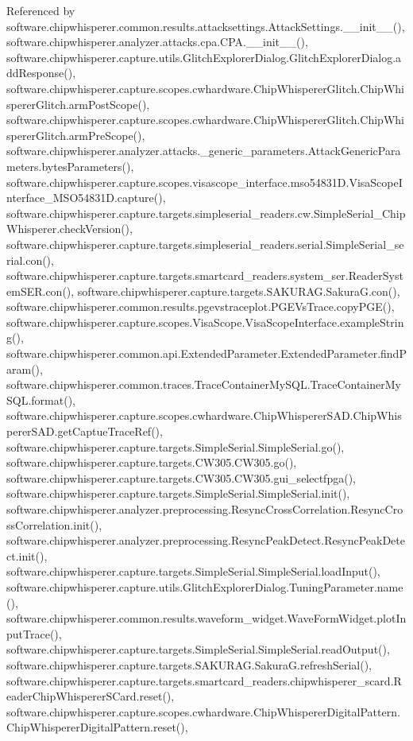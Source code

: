 Referenced by software.\+chipwhisperer.\+common.\+results.\+attacksettings.\+Attack\+Settings.\+\_\+\+\_\+init\+\_\+\+\_\+(), software.\+chipwhisperer.\+analyzer.\+attacks.\+cpa.\+C\+P\+A.\+\_\+\+\_\+init\+\_\+\+\_\+(), software.\+chipwhisperer.\+capture.\+utils.\+Glitch\+Explorer\+Dialog.\+Glitch\+Explorer\+Dialog.\+add\+Response(), software.\+chipwhisperer.\+capture.\+scopes.\+cwhardware.\+Chip\+Whisperer\+Glitch.\+Chip\+Whisperer\+Glitch.\+arm\+Post\+Scope(), software.\+chipwhisperer.\+capture.\+scopes.\+cwhardware.\+Chip\+Whisperer\+Glitch.\+Chip\+Whisperer\+Glitch.\+arm\+Pre\+Scope(), software.\+chipwhisperer.\+analyzer.\+attacks.\+\_\+generic\+\_\+parameters.\+Attack\+Generic\+Parameters.\+bytes\+Parameters(), software.\+chipwhisperer.\+capture.\+scopes.\+visascope\+\_\+interface.\+mso54831\+D.\+Visa\+Scope\+Interface\+\_\+\+M\+S\+O54831\+D.\+capture(), software.\+chipwhisperer.\+capture.\+targets.\+simpleserial\+\_\+readers.\+cw.\+Simple\+Serial\+\_\+\+Chip\+Whisperer.\+check\+Version(), software.\+chipwhisperer.\+capture.\+targets.\+simpleserial\+\_\+readers.\+serial.\+Simple\+Serial\+\_\+serial.\+con(), software.\+chipwhisperer.\+capture.\+targets.\+smartcard\+\_\+readers.\+system\+\_\+ser.\+Reader\+System\+S\+E\+R.\+con(), software.\+chipwhisperer.\+capture.\+targets.\+S\+A\+K\+U\+R\+A\+G.\+Sakura\+G.\+con(), software.\+chipwhisperer.\+common.\+results.\+pgevstraceplot.\+P\+G\+E\+Vs\+Trace.\+copy\+P\+G\+E(), software.\+chipwhisperer.\+capture.\+scopes.\+Visa\+Scope.\+Visa\+Scope\+Interface.\+example\+String(), software.\+chipwhisperer.\+common.\+api.\+Extended\+Parameter.\+Extended\+Parameter.\+find\+Param(), software.\+chipwhisperer.\+common.\+traces.\+Trace\+Container\+My\+S\+Q\+L.\+Trace\+Container\+My\+S\+Q\+L.\+format(), software.\+chipwhisperer.\+capture.\+scopes.\+cwhardware.\+Chip\+Whisperer\+S\+A\+D.\+Chip\+Whisperer\+S\+A\+D.\+get\+Captue\+Trace\+Ref(), software.\+chipwhisperer.\+capture.\+targets.\+Simple\+Serial.\+Simple\+Serial.\+go(), software.\+chipwhisperer.\+capture.\+targets.\+C\+W305.\+C\+W305.\+go(), software.\+chipwhisperer.\+capture.\+targets.\+C\+W305.\+C\+W305.\+gui\+\_\+selectfpga(), software.\+chipwhisperer.\+capture.\+targets.\+Simple\+Serial.\+Simple\+Serial.\+init(), software.\+chipwhisperer.\+analyzer.\+preprocessing.\+Resync\+Cross\+Correlation.\+Resync\+Cross\+Correlation.\+init(), software.\+chipwhisperer.\+analyzer.\+preprocessing.\+Resync\+Peak\+Detect.\+Resync\+Peak\+Detect.\+init(), software.\+chipwhisperer.\+capture.\+targets.\+Simple\+Serial.\+Simple\+Serial.\+load\+Input(), software.\+chipwhisperer.\+capture.\+utils.\+Glitch\+Explorer\+Dialog.\+Tuning\+Parameter.\+name(), software.\+chipwhisperer.\+common.\+results.\+waveform\+\_\+widget.\+Wave\+Form\+Widget.\+plot\+Input\+Trace(), software.\+chipwhisperer.\+capture.\+targets.\+Simple\+Serial.\+Simple\+Serial.\+read\+Output(), software.\+chipwhisperer.\+capture.\+targets.\+S\+A\+K\+U\+R\+A\+G.\+Sakura\+G.\+refresh\+Serial(), software.\+chipwhisperer.\+capture.\+targets.\+smartcard\+\_\+readers.\+chipwhisperer\+\_\+scard.\+Reader\+Chip\+Whisperer\+S\+Card.\+reset(), software.\+chipwhisperer.\+capture.\+scopes.\+cwhardware.\+Chip\+Whisperer\+Digital\+Pattern.\+Chip\+Whisperer\+Digital\+Pattern.\+reset(), 